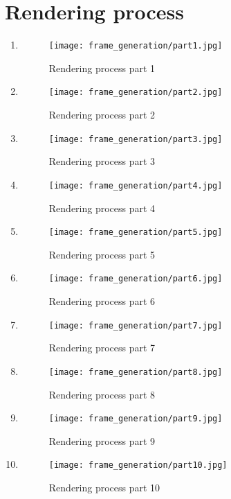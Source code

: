 \section{Rendering process}
\begin{enumerate}
    \item
        \begin{figure}[H]
          \texttt{[image: frame\_generation/part1.jpg]}
          \caption{Rendering process part 1}
        \end{figure}
    \item
        \begin{figure}[H]
          \texttt{[image: frame\_generation/part2.jpg]}
          \caption{Rendering process part 2}
        \end{figure}
    \item
        \begin{figure}[H]
          \texttt{[image: frame\_generation/part3.jpg]}
          \caption{Rendering process part 3}
        \end{figure}
    \item
        \begin{figure}[H]
          \texttt{[image: frame\_generation/part4.jpg]}
          \caption{Rendering process part 4}
        \end{figure}
    \item
        \begin{figure}[H]
          \texttt{[image: frame\_generation/part5.jpg]}
          \caption{Rendering process part 5}
        \end{figure}
    \item
        \begin{figure}[H]
          \texttt{[image: frame\_generation/part6.jpg]}
          \caption{Rendering process part 6}
        \end{figure}
    \item
        \begin{figure}[H]
          \texttt{[image: frame\_generation/part7.jpg]}
          \caption{Rendering process part 7}
        \end{figure}
    \item
        \begin{figure}[H]
          \texttt{[image: frame\_generation/part8.jpg]}
          \caption{Rendering process part 8}
        \end{figure}
    \item
        \begin{figure}[H]
          \texttt{[image: frame\_generation/part9.jpg]}
          \caption{Rendering process part 9}
        \end{figure}
    \item
        \begin{figure}[H]
          \texttt{[image: frame\_generation/part10.jpg]}
          \caption{Rendering process part 10}
        \end{figure}
\end{enumerate}